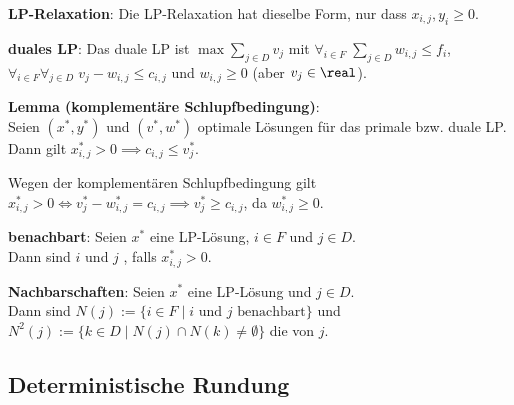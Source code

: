 \textbf{LP-Relaxation}:
Die LP-Relaxation hat dieselbe Form, nur dass $x_{i,j}, y_i \ge 0$.

\textbf{duales LP}:
Das duale LP ist
$\max \sum_{j \in D} v_j$ mit
$\forall_{i \in F}\; \sum_{j \in D} w_{i,j} \le f_i$,
$\forall_{i \in F} \forall_{j \in D}\; v_j - w_{i,j} \le c_{i,j}$ und
$w_{i,j} \ge 0$ (aber $v_j \in \real$).

\linie

\textbf{Lemma (komplementäre Schlupfbedingung)}:\\
Seien $(x^\ast, y^\ast)$ und $(v^\ast, w^\ast)$ optimale Lösungen für das primale bzw. duale LP.\\
Dann gilt $x_{i,j}^\ast > 0 \implies c_{i,j} \le v_j^\ast$.

\begin{Beweis}
    Wegen der komplementären Schlupfbedingung gilt\\
    $x_{i,j}^\ast > 0 \iff v_j^\ast - w_{i,j}^\ast = c_{i,j} \implies v_j^\ast \ge c_{i,j}$,
    da $w_{i,j}^\ast \ge 0$.
\end{Beweis}

\linie

\textbf{benachbart}:
Seien $x^\ast$ eine LP-Lösung, $i \in F$ und $j \in D$.\\
Dann sind $i$ und $j$ , falls $x_{i,j}^\ast > 0$.

\textbf{Nachbarschaften}:
Seien $x^\ast$ eine LP-Lösung und $j \in D$.\\
Dann sind
$N(j) := \{i \in F \;|\; \text{$i$ und $j$ benachbart}\}$ und\\
$N^2(j) := \{k \in D \;|\; N(j) \cap N(k) \not= \emptyset\}$ die  von $j$.

\pagebreak

\subsection{%
    Deterministische Rundung%
}

